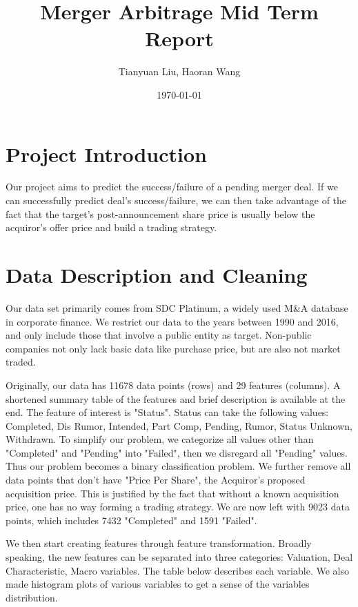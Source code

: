 \documentclass[a4paper]{article}
\title{Merger Arbitrage Mid Term Report}
\author{Tianyuan Liu, Haoran Wang}
\date{\today}
\begin{document}
\maketitle

\section{Project Introduction}
\label{sec:idea}

Our project aims to predict the success/failure of a pending merger deal. If we can successfully predict deal's success/failure, we can then take advantage of the fact that the target’s post-announcement share price is usually below the acquiror's offer price and build a trading strategy. 

\section{Data Description and Cleaning }
\label{sec:data}

Our data set primarily comes from SDC Platinum, a widely used M\&A database in corporate finance. We restrict our data to the years between 1990 and 2016, and only include those that involve a public entity as target. Non-public companies not only lack basic data like purchase price, but are also not market traded.

Originally, our data has 11678 data points (rows) and 29 features (columns). A shortened summary table of the features and brief description is available at the end. The feature of interest is "Status". Status can take the following values: Completed, Dis Rumor, Intended, Part Comp, Pending, Rumor, Status Unknown, Withdrawn. To simplify our problem, we categorize all values other than "Completed" and "Pending" into "Failed", then we disregard all "Pending" values. Thus our problem becomes a binary classification problem. We further remove all data points that don't have "Price Per Share", the Acquiror's proposed acquisition price. This is justified by the fact that without a known acquisition price, one has no way forming a trading strategy. We are now left with 9023 data points, which includes 7432 "Completed" and 1591 "Failed".

We then start creating features through feature transformation. Broadly speaking, the new features can be separated into three categories: Valuation, Deal Characteristic, Macro variables. The table below describes each variable. We also made histogram plots of various variables to get a sense of the variables distribution.
\end{document}
